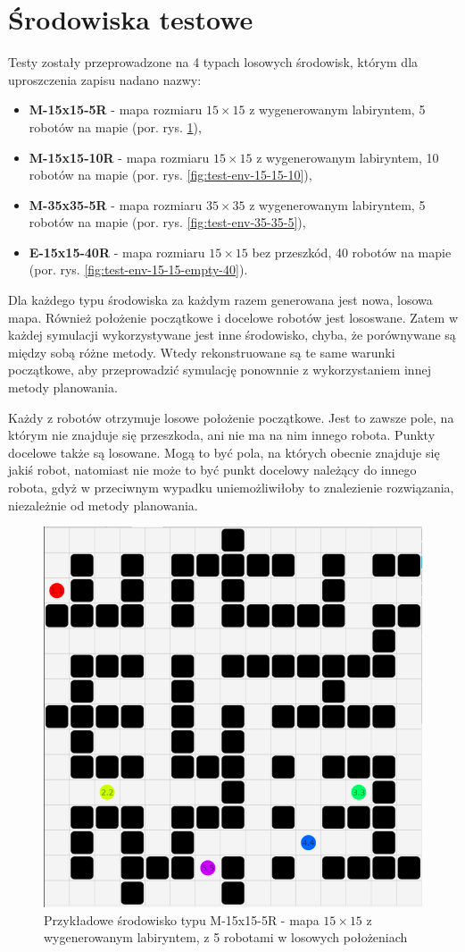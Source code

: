 \section{Środowiska testowe}
Testy zostały przeprowadzone na 4 typach losowych środowisk, którym dla uproszczenia zapisu nadano nazwy:
\begin{itemize}
	\item {\bf M-15x15-5R} - mapa rozmiaru $15 \times 15$ z wygenerowanym labiryntem, 5 robotów na mapie (por. rys. \ref{fig:test-env-15-15-5}),
	\item {\bf M-15x15-10R} - mapa rozmiaru $15 \times 15$ z wygenerowanym labiryntem, 10 robotów na mapie (por. rys. \ref{fig:test-env-15-15-10}),
	\item {\bf M-35x35-5R} - mapa rozmiaru $35 \times 35$ z wygenerowanym labiryntem, 5 robotów na mapie (por. rys. \ref{fig:test-env-35-35-5}),
	\item {\bf E-15x15-40R} - mapa rozmiaru $15 \times 15$ bez przeszkód, 40 robotów na mapie (por. rys. \ref{fig:test-env-15-15-empty-40}).
\end{itemize}
Dla każdego typu środowiska za każdym razem generowana jest nowa, losowa mapa. Również położenie początkowe i docelowe robotów jest lososwane. Zatem w każdej symulacji wykorzystywane jest inne środowisko, chyba, że porównywane są między sobą różne metody. Wtedy rekonstruowane są te same warunki początkowe, aby przeprowadzić symulację ponownnie z wykorzystaniem innej metody planowania.

Każdy z robotów otrzymuje losowe położenie początkowe. Jest to zawsze pole, na którym nie znajduje się przeszkoda, ani nie ma na nim innego robota.
Punkty docelowe także są losowane. Mogą to być pola, na których obecnie znajduje się jakiś robot, natomiast nie może to być punkt docelowy należący do innego robota, gdyż w przeciwnym wypadku uniemożliwiłoby to znalezienie rozwiązania, niezależnie od metody planowania.

\begin{figure}
	\centering
	\includegraphics[width=0.6\columnwidth]{img/robopath/tests-15-15-5}
	\caption{Przykładowe środowisko typu M-15x15-5R - mapa $15 \times 15$ z wygenerowanym labiryntem, z 5 robotami w losowych położeniach}
	\label{fig:test-env-15-15-5}
\end{figure}


